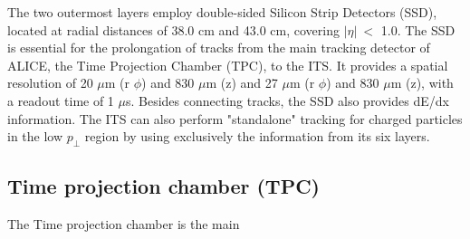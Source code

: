\documentclass[12pt,a4paper]{book}
\begin{document}
The two outermost layers employ double-sided Silicon Strip Detectors (SSD), located at radial distances of 38.0 cm and 43.0 cm, covering $|\eta|\ <$ 1.0. The SSD is essential for the prolongation of tracks from the main tracking detector of ALICE, the Time Projection Chamber (TPC), to the ITS. It provides a spatial resolution of 20 $\mu$m (r $\phi$) and 830 $\mu$m (z) and 27 $\mu$m (r $\phi$) and 830 $\mu$m (z), with a readout time of 1 $\mu$s. Besides connecting tracks, the SSD also provides dE/dx information. The ITS can also perform "standalone" tracking for charged particles in the low $p_\perp$ region by using exclusively the information from its six layers. 
	\cite{Padhan:2924203} \cite{amsdottorato9036} \cite{Cheng:2908766} \cite{Arata:2922803}
	
	\subsection{Time projection chamber (TPC)}
	The Time projection chamber is the main
\end{document}
